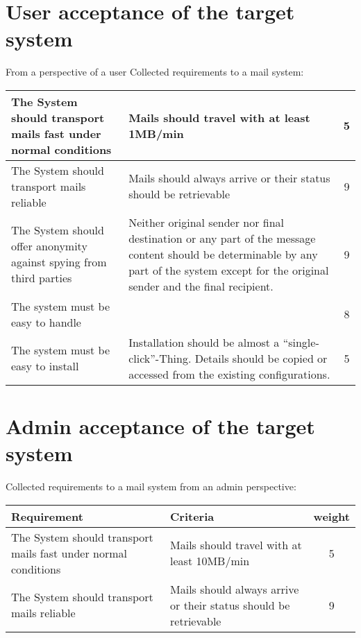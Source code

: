 \documentclass[11pt,a4paper]{book}
\begin{document}
\section{User acceptance of the target system}
From a perspective of a user 
Collected requirements to a mail system:\par
\begin{center}
\tablelasttail{\hline}
\begin{supertabular}{|p{5cm}|p{5cm}|c|}\hline
The System should transport mails fast under normal conditions & Mails should travel with at least 1MB/min & 5\\\hline
The System should transport mails reliable & Mails should always arrive or their status should be retrievable & 9\\\hline
The System should offer anonymity against spying from third parties & Neither original sender nor final destination or any part of the message content should be determinable by any part of the system except for the original sender and the final recipient.& 9\\\hline
The system must be easy to handle &&8\\\hline
The system must be easy to install & Installation should be almost a ``single-click''-Thing. Details should be copied or accessed from the existing configurations.&5\\\hline
\end{supertabular}
\end{center}

\section{Admin acceptance of the target system}
Collected requirements to a mail system from an admin perspective:\par
\begin{tabular}{|p{5cm}|p{5cm}|c|}\hline
Requirement& Criteria& weight\\\hline
The System should transport mails fast under normal conditions & Mails should travel with at least 10MB/min & 5\\
The System should transport mails reliable & Mails should always arrive or their status should be retrievable & 9\\
\hline\end{tabular}
\end{document}

